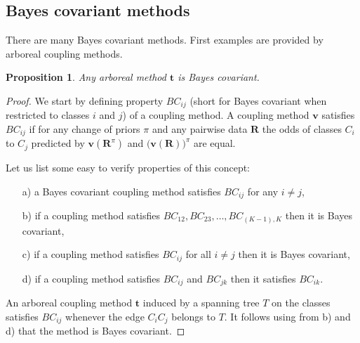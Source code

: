 \documentclass[twoside,11pt]{article}
\newtheorem{prop}{Proposition}
\begin{document}
\subsection{Bayes covariant methods}

There are many Bayes covariant methods. First examples are provided by arboreal coupling methods. 


\begin{prop}
Any arboreal method $\boldsymbol{t}$ is Bayes covariant.
\end{prop}
\begin{proof}
We start by defining property $BC_{ij}$ (short for Bayes covariant when restricted to classes $i$ and $j$) of a coupling method. A coupling method $\boldsymbol{v}$ satisfies $BC_{ij}$ if for any change of priors $\pi$ and any  pairwise data $\boldsymbol{R}$ the odds of classes $C_i$ to $C_j$ predicted by $\boldsymbol{v}(\boldsymbol{R}^\pi)$ and $\bigl(\boldsymbol{v}(\boldsymbol{R})\bigr)^\pi$ are equal. 

Let us list some easy to verify properties of this concept:

\begin{itemize}
\item[a)] a Bayes covariant coupling method satisfies $BC_{ij}$ for any $i\not= j$,
\item[b)] if a coupling method satisfies $BC_{12}, BC_{23}, \ldots, BC_{(K-1),K}$ then it is Bayes covariant,
\item[c)] if a coupling method satisfies $BC_{ij}$ for all $i\not= j$ then it is Bayes covariant,
\item[d)] if a coupling method satisfies $BC_{ij}$ and $BC_{jk}$ then it satisfies $BC_{ik}$.
\end{itemize}

An arboreal coupling method $\boldsymbol{t}$ induced by a spanning tree $T$ on the classes satisfies $BC_{ij}$ whenever the edge $C_iC_j$ belongs to $T$. It follows using from b) and d) that the method is Bayes covariant.
	

\end{proof}
\end{document}
